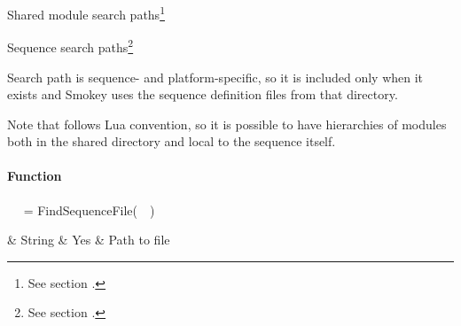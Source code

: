 \begin{SearchPaths}[resume]

	\item[] Shared module search paths\footnote{See section
	.}

	\item {\LstStyle{}}
	\item {\LstStyle{}}

\end{SearchPaths}

\begin{SearchPaths}[resume]

	\item[] Sequence search paths\footnote{See section
	.}

	\item {\LstStyle{}}
	\label{itm:RequirePlatformPath}

	\item {\LstStyle{}}

\end{SearchPaths}

Search path  is sequence- and
platform-specific, so it is included only when it exists and Smokey uses the
sequence definition files from that directory.

Note that  follows Lua convention, so it is possible to have
hierarchies of modules both in the shared directory and local to the sequence
itself.

\paragraph{ Function}

\begin{minipage}{\linewidth}
\begin{SmokeyApi}
~~ = FindSequenceFile(~~)
\end{SmokeyApi}

\begin{ApiTable}
	 & String & Yes & Path to file \\
\end{ApiTable}
\end{minipage}

